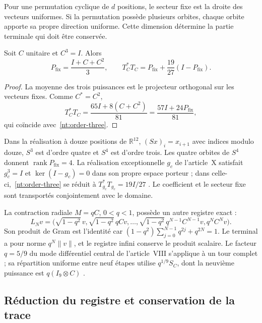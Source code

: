 Pour une permutation cyclique de \(d\) positions, le secteur fixe est la droite des vecteurs uniformes. Si la permutation possède plusieurs orbites, chaque orbite apporte sa propre direction uniforme. Cette dimension détermine la partie terminale qui doit être conservée.

\begin{proposition}
Soit \(C\) unitaire et \(C^3=I\). Alors
\begin{equation}
 P_{\mathrm{fix}}=\frac{I+C+C^2}{3},
 \qquad
 T_C^*T_C=P_{\mathrm{fix}}+
 \frac{19}{27}(I-P_{\mathrm{fix}}).
 \label{nt:order-three}
\end{equation}
\end{proposition}

\begin{proof}
La moyenne des trois puissances est le projecteur orthogonal
sur les vecteurs fixes. Comme \(C^*=C^2\),
\[
 T_C^*T_C=\frac{65I+8(C+C^2)}{81}
 =\frac{57I+24P_{\mathrm{fix}}}{81},
\]
qui coïncide avec~\eqref{nt:order-three}.
\end{proof}

Dans la réalisation à douze positions de \(\mathbb R^{12}\), \((Sx)_i=x_{i+1}\) avec indices modulo douze, \(S^3\) est d'ordre quatre et \(S^4\) est d'ordre trois. Les quatre orbites de \(S^4\) donnent \(\operatorname{rank}P_{\mathrm{fix}}=4\). La réalisation exceptionnelle \(g_c\) de l'article~X satisfait \(g_c^3=I\) et \(\ker(I-g_c)=0\) dans son propre espace porteur ; dans celle-ci,~\eqref{nt:order-three} se réduit à \(T_{g_c}^*T_{g_c}=19I/27\) \cite{hmtX}. Le coefficient et le secteur fixe sont transportés conjointement avec le domaine.

La contraction radiale \(M=qC\), \(0<q<1\), possède un autre registre
exact :
\begin{equation}
 L_Nv=\bigl(\sqrt{1-q^2}\,v,
 \sqrt{1-q^2}\,qCv,\ldots,
 \sqrt{1-q^2}\,q^{N-1}C^{N-1}v,q^NC^Nv\bigr).
 \label{nt:radial-record}
\end{equation}
Son produit de Gram est l’identité car
\((1-q^2)\sum_{j=0}^{N-1}q^{2j}+q^{2N}=1\).
Le terminal a pour norme \(q^N\|v\|\), et le registre infini
conserve le produit scalaire. Le facteur \(q=5/9\) du mode
différentiel central de l’article~VIII s’applique à un tour
complet ; sa répartition uniforme entre neuf étapes utilise
\(q^{1/9}S_C\), dont la neuvième puissance est
\(q(I_9\otimes C)\) \cite{HMT-VIII}.

\subsection{Réduction du registre et conservation de la trace}

